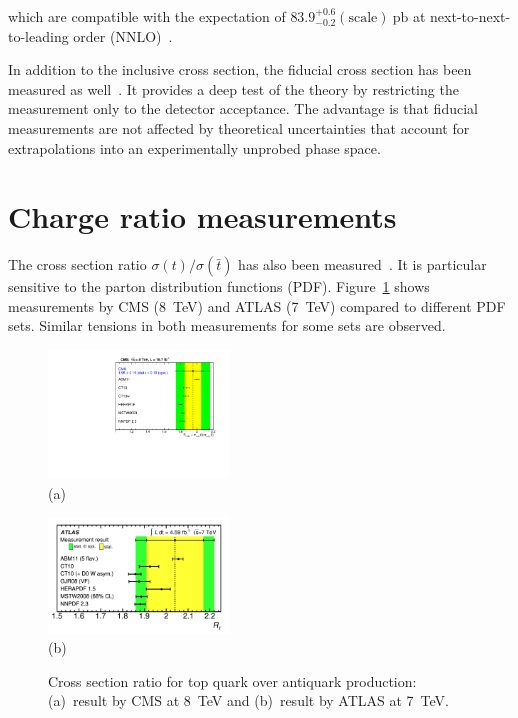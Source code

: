 \documentclass{PoS}
\begin{document}
which are compatible with the expectation of $83.9_{-0.2}^{+0.6}\mathrm{(scale)}~\mathrm{pb}$ at next-to-next-to-leading order (NNLO)~\cite{Brucherseifer-xsec8}.

In addition to the inclusive cross section, the fiducial cross section has been measured as well~\cite{atlas-xsec8,CMS-PAS-TOP-15-007}. It provides a deep test of the theory by restricting the measurement only to the detector acceptance. The advantage is that fiducial measurements are not affected by theoretical uncertainties that account for extrapolations into an experimentally unprobed phase space.





\section{Charge ratio measurements}
The cross section ratio $\sigma(t)/\sigma(\bar{t})$ has also been measured~\cite{cms-xsec8,atlas-charge7}. It is particular sensitive to the parton distribution functions (PDF). Figure~\ref{fig:charge-ratio} shows measurements by CMS (8~TeV) and ATLAS (7~TeV) compared to different PDF sets. Similar tensions in both measurements for some sets are observed. 

\begin{figure}[htbp]
\begin{center}
\parbox[t]{0.45\textwidth}{\centering\includegraphics[width=0.43\textwidth]{cms_xsec8/charge.pdf}\\(a)}
\parbox[t]{0.45\textwidth}{\centering\includegraphics[width=0.43\textwidth]{atlas_charge7/charge.pdf}\\(b)}
\end{center}
\caption{\label{fig:charge-ratio}Cross section ratio for top quark over antiquark production: (a)~result by CMS at 8~TeV and (b)~result by ATLAS at 7~TeV.}

\end{figure}
\end{document}
